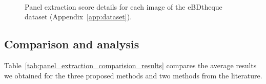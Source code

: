 \begin{figure}[!ht]
  \\
    \caption[Panel extraction score details for each image of the eBDtheque dataset]{Panel extraction score details for each image of the eBDtheque dataset (Appendix~\ref{app:dataset}).}
    \label{fig:ex:panel_detection_result_details}
\end{figure}


\subsection{Comparison and analysis} %
\label{sub:result_analysis}

Table~\ref{tab:panel_extraction_comparision_results} compares the average results we obtained for the three proposed methods and two methods from the literature.



